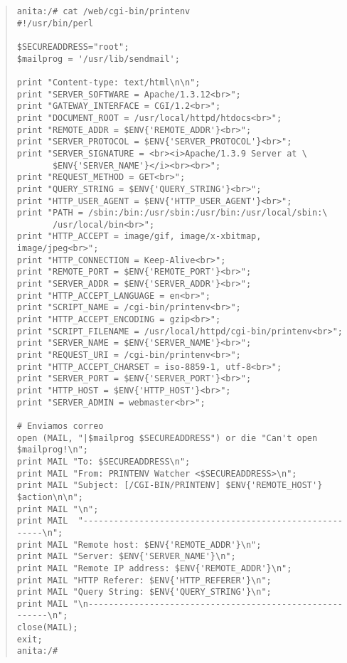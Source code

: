 \begin{quote}
\begin{verbatim}
anita:/# cat /web/cgi-bin/printenv
#!/usr/bin/perl

$SECUREADDRESS="root";
$mailprog = '/usr/lib/sendmail';

print "Content-type: text/html\n\n";
print "SERVER_SOFTWARE = Apache/1.3.12<br>";
print "GATEWAY_INTERFACE = CGI/1.2<br>";
print "DOCUMENT_ROOT = /usr/local/httpd/htdocs<br>";
print "REMOTE_ADDR = $ENV{'REMOTE_ADDR'}<br>";
print "SERVER_PROTOCOL = $ENV{'SERVER_PROTOCOL'}<br>";
print "SERVER_SIGNATURE = <br><i>Apache/1.3.9 Server at \
       $ENV{'SERVER_NAME'}</i><br><br>";
print "REQUEST_METHOD = GET<br>";
print "QUERY_STRING = $ENV{'QUERY_STRING'}<br>";
print "HTTP_USER_AGENT = $ENV{'HTTP_USER_AGENT'}<br>";
print "PATH = /sbin:/bin:/usr/sbin:/usr/bin:/usr/local/sbin:\
       /usr/local/bin<br>";
print "HTTP_ACCEPT = image/gif, image/x-xbitmap, image/jpeg<br>";
print "HTTP_CONNECTION = Keep-Alive<br>";
print "REMOTE_PORT = $ENV{'REMOTE_PORT'}<br>";
print "SERVER_ADDR = $ENV{'SERVER_ADDR'}<br>";
print "HTTP_ACCEPT_LANGUAGE = en<br>";
print "SCRIPT_NAME = /cgi-bin/printenv<br>";
print "HTTP_ACCEPT_ENCODING = gzip<br>";
print "SCRIPT_FILENAME = /usr/local/httpd/cgi-bin/printenv<br>";
print "SERVER_NAME = $ENV{'SERVER_NAME'}<br>";
print "REQUEST_URI = /cgi-bin/printenv<br>";
print "HTTP_ACCEPT_CHARSET = iso-8859-1, utf-8<br>";
print "SERVER_PORT = $ENV{'SERVER_PORT'}<br>";
print "HTTP_HOST = $ENV{'HTTP_HOST'}<br>";
print "SERVER_ADMIN = webmaster<br>";

# Enviamos correo
open (MAIL, "|$mailprog $SECUREADDRESS") or die "Can't open $mailprog!\n";
print MAIL "To: $SECUREADDRESS\n";
print MAIL "From: PRINTENV Watcher <$SECUREADDRESS>\n";
print MAIL "Subject: [/CGI-BIN/PRINTENV] $ENV{'REMOTE_HOST'} $action\n\n";
print MAIL "\n";
print MAIL  "--------------------------------------------------------\n";
print MAIL "Remote host: $ENV{'REMOTE_ADDR'}\n";
print MAIL "Server: $ENV{'SERVER_NAME'}\n";
print MAIL "Remote IP address: $ENV{'REMOTE_ADDR'}\n";
print MAIL "HTTP Referer: $ENV{'HTTP_REFERER'}\n";
print MAIL "Query String: $ENV{'QUERY_STRING'}\n";
print MAIL "\n--------------------------------------------------------\n";
close(MAIL);
exit;
anita:/#
\end{verbatim}
\end{quote}
